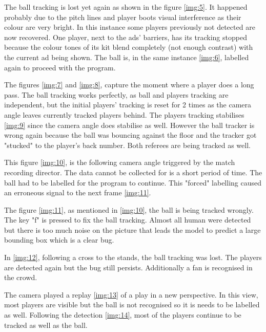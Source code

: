 \documentclass[
    11pt,
    oneside
]{report}
\begin{document}
The ball tracking is lost yet again as shown in the figure \ref{img:5}. It happened probably due to the pitch lines and player boots visual interference as their colour are very bright. In this instance some players previously not detected are now recovered. One player, next to the ads' barriers, has its tracking stopped because the colour tones of its kit blend completely (not enough contrast) with the current ad being shown. The ball is, in the same instance \ref{img:6}, labelled again to proceed with the program.



The figures \ref{img:7} and \ref{img:8}, capture the moment where a player does a long pass. The ball tracking works perfectly, as ball and players tracking are independent, but the initial players' tracking is reset for 2 times as the camera angle leaves currently tracked players behind.
The players tracking stabilises \ref{img:9} since the camera angle does stabilise as well. However the ball tracker is wrong again because the ball was bouncing against the floor and the tracker got "stucked" to the player's back number. Both referees are being tracked as well.



This figure \ref{img:10}, is the following camera angle triggered by the match recording director. The data cannot be collected for is a short period of time. The ball had to be labelled for the program to continue. This "forced" labelling caused an erroneous signal to the next frame \ref{img:11}.



The figure \ref{img:11}, as mentioned in \ref{img:10}, the ball is being tracked wrongly. The key "f" is pressed to fix the ball tracking. Almost all human were detected but there is too much noise on the picture that leads the model to predict a large bounding box which is a clear bug.


In \ref{img:12}, following a cross to the stands, the ball tracking was lost. The players are detected again but the bug still persists. Additionally a fan is recognised in the crowd.



The camera played a replay \ref{img:13} of a play in a new perspective. In this view, most players are visible but the ball is not recognised so it is needs to be labelled as well. Following the detection \ref{img:14}, most of the players continue to be tracked as well as the ball.
\end{document}
